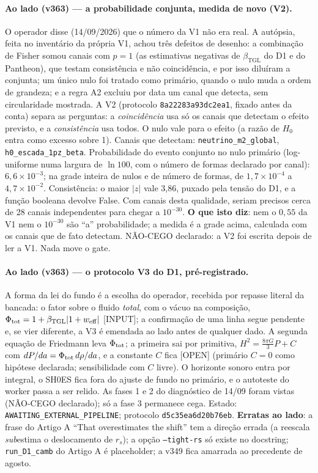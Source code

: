 \documentclass[11pt]{article}
\newcommand{\bTGL}{\beta_{\mathrm{TGL}}}\newcommand{\Msun}{M_{\odot}}\newcommand{\TGL}{\mathrm{TGL}}
\theoremstyle{definition}\newtheorem{deriv}{Derivação}
\begin{document}
\paragraph*{Ao lado (v363) --- a probabilidade conjunta, medida de novo (V2).} O operador disse (14/09/2026) que o número da V1 não era real. A autópsia, feita no inventário da própria V1, achou três defeitos de desenho: a combinação de Fisher somou canais com $p=1$ (as estimativas negativas de $\bTGL$ do D1 e do Pantheon), que testam consistência e não coincidência, e por isso diluíram a conjunta; um único nulo foi tratado como primário, quando o nulo muda a ordem de grandeza; e a regra A2 excluiu por data um canal que detecta, sem circularidade mostrada. A V2 (protocolo \texttt{8a22283a93dc2ea1}, fixado antes da conta) separa as perguntas: a \emph{coincidência} usa só os canais que detectam o efeito previsto, e a \emph{consistência} usa todos. O nulo vale para o efeito (a razão de $H_0$ entra como excesso sobre 1). Canais que detectam: \texttt{neutrino\_m2\_global}, \texttt{h0\_escada\_1pz\_beta}. Probabilidade do evento conjunto no nulo primário (log-uniforme numa largura de $\ln 100$, com o número de formas declarado por canal): $6,6\times10^{-3}$; na grade inteira de nulos e de número de formas, de $1,7\times10^{-4}$ a $4,7\times10^{-2}$. Consistência: o maior $|z|$ vale 3,86, puxado pela tensão do D1, e a função booleana devolve False. Com canais desta qualidade, seriam precisos cerca de 28 canais independentes para chegar a $10^{-30}$. \textbf{O que isto diz}: nem o $0{,}55$ da V1 nem o $10^{-30}$ são ``a'' probabilidade; a medida é a grade acima, calculada com os canais que de fato detectam. NÃO-CEGO declarado: a V2 foi escrita depois de ler a V1. Nada move o gate.

\paragraph*{Ao lado (v363) --- o protocolo V3 do D1, pré-registrado.} A forma da lei do fundo é a escolha do operador, recebida por repasse literal da bancada: o fator sobre o fluido \emph{total}, com o vácuo na composição, $\Phi_{\rm tot}=1+\bTGL|1+w_{\rm eff}|$ [INPUT]; a confirmação de uma linha segue pendente e, se vier diferente, a V3 é emendada ao lado antes de qualquer dado. A segunda equação de Friedmann leva $\Phi_{\rm tot}$; a primeira sai por primitiva, $H^2=\tfrac{8\pi G}{3}P+C$ com $dP/da=\Phi_{\rm tot}\,d\rho/da$, e a constante $C$ fica [OPEN] (primário $C=0$ como hipótese declarada; sensibilidade com $C$ livre). O horizonte sonoro entra por integral, o SH0ES fica fora do ajuste de fundo no primário, e o autoteste do worker passa a ser relido. As fases 1 e 2 do diagnóstico de 14/09 foram vistas (NÃO-CEGO declarado); só a fase 3 permanece cega. Estado: \texttt{AWAITING\_EXTERNAL\_PIPELINE}; protocolo \texttt{d5c35ea6d20b76eb}. \textbf{Erratas ao lado}: a frase do Artigo A ``That overestimates the shift'' tem a direção errada (a reescala \emph{sub}estima o deslocamento de $r_s$); a opção \texttt{--tight-rs} só existe no docstring; \texttt{run\_D1\_camb} do Artigo A é placeholder; a v349 fica amarrada ao precedente de agosto.
\end{document}
